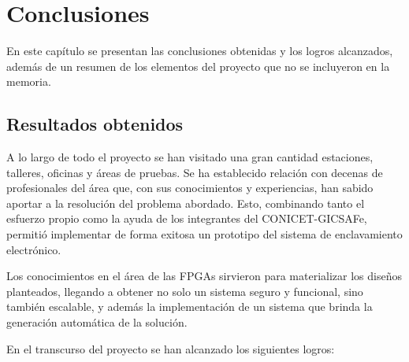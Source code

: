 
\chapter{Conclusiones} %

\label{Chapter5} %


En este capítulo se presentan las conclusiones obtenidas y los logros alcanzados, además de un resumen de los elementos del proyecto que no se incluyeron en la memoria.


\section{Resultados obtenidos}
	
	A lo largo de todo el proyecto se han visitado una gran cantidad estaciones, talleres, oficinas y áreas de pruebas. Se ha establecido relación con decenas de profesionales del área que, con sus conocimientos y experiencias, han sabido aportar a la resolución del problema abordado. Esto, combinando tanto el esfuerzo propio como la ayuda de los integrantes del CONICET-GICSAFe, permitió implementar de forma exitosa un prototipo del sistema de enclavamiento electrónico.
	
	Los conocimientos en el área de las FPGAs sirvieron para materializar los diseños planteados, llegando a obtener no solo un sistema seguro y funcional, sino también escalable, y además la implementación de un sistema que brinda la generación automática de la solución.
	

	En el transcurso del proyecto se han alcanzado los siguientes logros:
	
